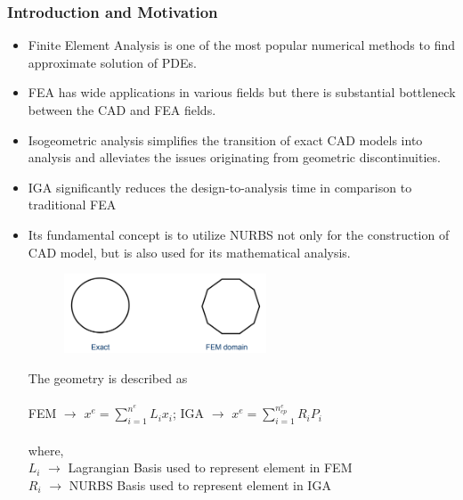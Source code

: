 \documentclass{beamer}
\begin{document}
\begin{frame}[allowframebreaks] \frametitle{Introduction and Motivation}

  \begin{itemize}

  \item Finite Element Analysis is one of the most popular numerical methods to find approximate solution of PDEs.

  \item FEA has wide applications in various fields but there is substantial bottleneck between the CAD and FEA fields.
  
  \item Isogeometric analysis simplifies the transition of exact CAD models into analysis and alleviates the issues originating from geometric discontinuities.
  
  \item IGA significantly reduces the design-to-analysis time in comparison to traditional FEA
  
  \item Its fundamental concept is to utilize NURBS not only for the construction of CAD model, but is also used for its mathematical analysis.

\newpage
\begin{figure}
    \begin{center}
    \includegraphics[width=6cm]{figures/exact_vs_fem.PNG}
    \end{center}
    \label{geometry_exact_fem}
\end{figure}
The geometry is described as\\~\\
FEM $\rightarrow$ $x^e=\sum_{i=1}^{n^e}L_ix_i$; \; \; \; \; IGA $\rightarrow$ $x^e=\sum_{i=1}^{n^e_{cp}}R_iP_i$ \\~\\
where, \\
$L_i$ $\rightarrow$ Lagrangian Basis used to represent element in FEM \\
$R_i$ $\rightarrow$ NURBS Basis used to represent element in IGA


\end{itemize}
\end{frame}
\end{document}
